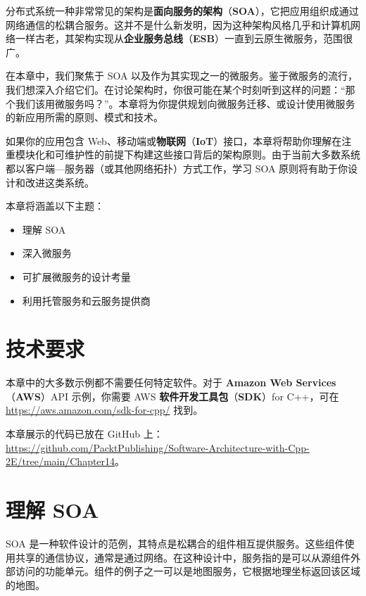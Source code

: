 \label{idx:1303}
\label{idx:1304}
分布式系统一种非常常见的架构是\textbf{面向服务的架构}（\textbf{SOA}），它把应用组织成通过网络通信的松耦合服务。这并不是什么新发明，因为这种架构风格几乎和计算机网络一样古老，其架构实现从\textbf{企业服务总线}（\textbf{ESB}）一直到云原生微服务，范围很广。

在本章中，我们聚焦于 SOA 以及作为其实现之一的微服务。鉴于微服务的流行，我们想深入介绍它们。在讨论架构时，你很可能在某个时刻听到这样的问题：“那个我们该用微服务吗？”。本章将为你提供规划向微服务迁移、或设计使用微服务的新应用所需的原则、模式和技术。

\label{idx:1305}
如果你的应用包含 Web、移动端或\textbf{物联网}（\textbf{IoT}）接口，本章将帮助你理解在注重模块化和可维护性的前提下构建这些接口背后的架构原则。由于当前大多数系统都以客户端—服务器（或其他网络拓扑）方式工作，学习 SOA 原则将有助于你设计和改进这类系统。

本章将涵盖以下主题：

\begin{itemize}
\item 理解 SOA
\item 深入微服务
\item 可扩展微服务的设计考量
\item 利用托管服务和云服务提供商
\end{itemize}

\section{技术要求}

本章中的大多数示例都不需要任何特定软件。对于 \textbf{Amazon Web Services }（\textbf{AWS}）API 示例，你需要 AWS\textbf{ 软件开发工具包}（\textbf{SDK}）for C++，可在 \href{https://aws.amazon.com/sdk-for-cpp/}{https://aws.amazon.com/sdk-for-cpp/} 找到。

本章展示的代码已放在 GitHub 上：\href{https://github.com/PacktPublishing/Software-Architecture-with-Cpp-2E/tree/main/Chapter14}{https://github.com/PacktPublishing/Software-Architecture-with-Cpp-2E/tree/main/Chapter14}。

\section{理解 SOA}

\label{idx:1306}
SOA 是一种软件设计的范例，其特点是松耦合的组件相互提供服务。这些组件使用共享的通信协议，通常是通过网络。在这种设计中，服务指的是可以从源组件外部访问的功能单元。组件的例子之一可以是地图服务，它根据地理坐标返回该区域的地图。

